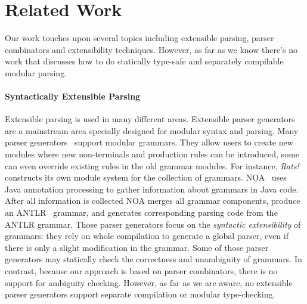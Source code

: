 \section{Related Work}\label{sec:relatedwork}

%
%
%
%

Our work touches upon several topics including extensible parsing,
parser combinators and extensibility techniques. However, as far as we
know there's no work that discusses how to do statically type-safe and
separately compilable modular parsing.

\begin{comment}
There has been a
great amount of related papers on those topics. Some
inspired us of this paper and encourage us for more exploration. This
section will try to lead a discussion on what difference we have made.
\end{comment}

\paragraph{Syntactically Extensible Parsing} Extensible parsing is
used in many different areas. Extensible parser generators are a
mainstream area specially designed for modular syntax and
parsing. Many parser
generators~\cite{antlr1995,Grimm2006,Gouseti2014,Warth2016} support
modular grammars. They allow users to create new modules where new
non-terminals and production rules can be introduced, some can even
override existing rules in the old grammar modules. For instance,
\textit{Rats!}~\cite{Grimm2006} constructs its own module system for
the collection of grammars.  NOA~\cite{Gouseti2014} uses Java
annotation processing to gather information about grammars in Java
code. After all information is collected NOA merges all grammar
components, produce an ANTLR~\cite{antlr1995} grammar, and generates
corresponding parsing code from the ANTLR grammar.  Those parser
generators focus on the \textit{syntactic extensibility} of grammars:
they rely on whole compilation to generate a global parser, even if
there is only a slight modification in the grammar. Some of those
parser generators may statically check the correctness and unambiguity
of grammars. In contrast, because our approach is based on parser
combinators, there is no support for ambiguity checking.  However, as
far as we are aware, no extensible parser generators support separate
compilation or modular type-checking.

